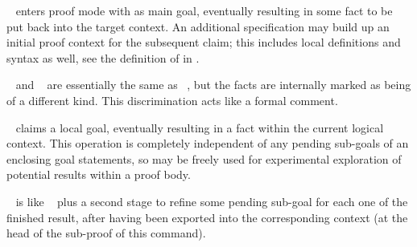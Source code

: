 \begin{isabellebody}
\begin{isamarkuptext}
\begin{descr}
  \item [\hyperlink{command.lemma}{\mbox{\isa{\isacommand{lemma}}}}~\isa{{\isachardoublequote}a{\isacharcolon}\ {\isasymphi}{\isachardoublequote}}] enters proof mode with
  \isa{{\isasymphi}} as main goal, eventually resulting in some fact \isa{{\isachardoublequote}{\isasymturnstile}\ {\isasymphi}{\isachardoublequote}} to be put back into the target context.  An additional
   specification may build up an initial proof
  context for the subsequent claim; this includes local definitions
  and syntax as well, see the definition of \hyperlink{syntax.contextelem}{\mbox{}} in
  .
  
  \item [\hyperlink{command.theorem}{\mbox{\isa{\isacommand{theorem}}}}~\isa{{\isachardoublequote}a{\isacharcolon}\ {\isasymphi}{\isachardoublequote}} and \hyperlink{command.corollary}{\mbox{\isa{\isacommand{corollary}}}}~\isa{{\isachardoublequote}a{\isacharcolon}\ {\isasymphi}{\isachardoublequote}}] are essentially the same as \hyperlink{command.lemma}{\mbox{}}~, but the facts are internally marked as
  being of a different kind.  This discrimination acts like a formal
  comment.
  
  \item [\hyperlink{command.have}{\mbox{\isa{\isacommand{have}}}}~\isa{{\isachardoublequote}a{\isacharcolon}\ {\isasymphi}{\isachardoublequote}}] claims a local goal,
  eventually resulting in a fact within the current logical context.
  This operation is completely independent of any pending sub-goals of
  an enclosing goal statements, so \hyperlink{command.have}{\mbox{}} may be freely
  used for experimental exploration of potential results within a
  proof body.
  
  \item [\hyperlink{command.show}{\mbox{\isa{\isacommand{show}}}}~\isa{{\isachardoublequote}a{\isacharcolon}\ {\isasymphi}{\isachardoublequote}}] is like \hyperlink{command.have}{\mbox{}}~ plus a second stage to refine some pending
  sub-goal for each one of the finished result, after having been
  exported into the corresponding context (at the head of the
  sub-proof of this \hyperlink{command.show}{\mbox{}} command).
  

\end{descr}
\end{isamarkuptext}
\end{isabellebody}
